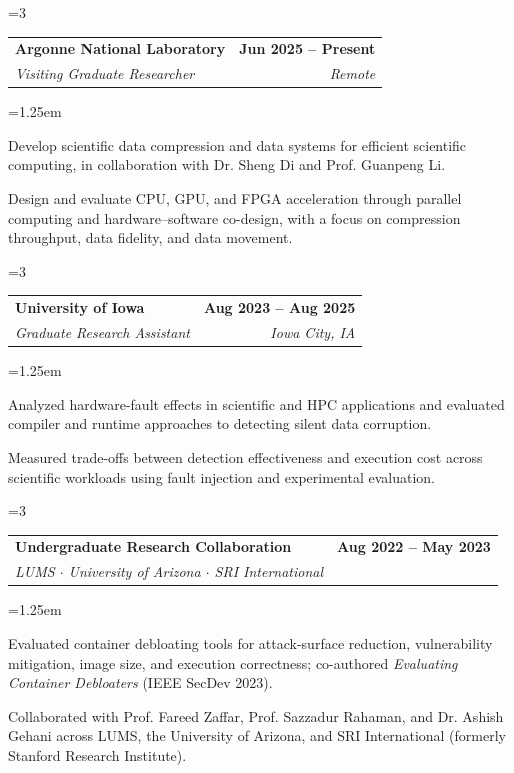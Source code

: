 \documentclass[10pt,letterpaper]{article}
\makeatletter
\newcommand{\needspace}[1]{\par\begingroup\dimen0=#1\relax\ifdim\dimexpr\pagegoal-\pagetotal\relax<\dimen0\vfil\break\fi\endgroup}
\newenvironment{cvitems}{\begin{list}{\textbullet}{\leftmargin=1.25em\itemsep=1.5pt\topsep=1pt\parsep=0pt\partopsep=0pt}}{\end{list}\vspace{.18em}}
\newcommand{\cventry}[4]{\needspace{3\baselineskip}\begin{tabularx}{\textwidth}{@{}Xr@{}}\textbf{#1}&\textbf{#2}\\\textit{#3}&\textit{#4}\end{tabularx}\vspace{-.20em}}
\makeatother
\begin{document}
\cventry{Argonne National Laboratory}{Jun 2025 -- Present}{Visiting Graduate Researcher}{Remote}
\begin{cvitems}
  \item Develop scientific data compression and data systems for efficient scientific computing, in collaboration with Dr. Sheng Di and Prof. Guanpeng Li.
  \item Design and evaluate CPU, GPU, and FPGA acceleration through parallel computing and hardware--software co-design, with a focus on compression throughput, data fidelity, and data movement.
\end{cvitems}

\cventry{University of Iowa}{Aug 2023 -- Aug 2025}{Graduate Research Assistant}{Iowa City, IA}
\begin{cvitems}
  \item Analyzed hardware-fault effects in scientific and HPC applications and evaluated compiler and runtime approaches to detecting silent data corruption.
  \item Measured trade-offs between detection effectiveness and execution cost across scientific workloads using fault injection and experimental evaluation.
\end{cvitems}

\cventry{Undergraduate Research Collaboration}{Aug 2022 -- May 2023}{LUMS $\cdot$ University of Arizona $\cdot$ SRI International}{}
\begin{cvitems}
  \item Evaluated container debloating tools for attack-surface reduction, vulnerability mitigation, image size, and execution correctness; co-authored \textit{Evaluating Container Debloaters} (IEEE SecDev 2023).
  \item Collaborated with Prof. Fareed Zaffar, Prof. Sazzadur Rahaman, and Dr. Ashish Gehani across LUMS, the University of Arizona, and SRI International (formerly Stanford Research Institute).
\end{cvitems}

\newpage
\end{document}
